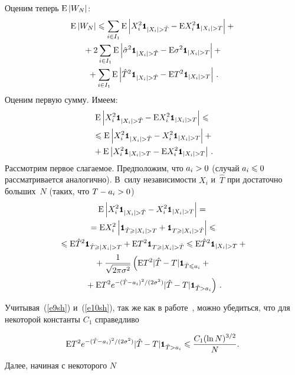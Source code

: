 \begin{multicols}{2}
Оценим теперь $\mbox{E}\left\vert W_N\right\vert$:
\begin{multline}
\mbox{E}\abs{W_N}\leqslant\sum\limits_{i\in I_1}\mbox{E}\abs{X_i^2\Ik_{|X_i|> 
\hat{T}}-\mbox{E}X_i^2\Ik_{|X_i|> T}}+{}\\
{}+2\sum\limits_{i\in I_1}\mbox{E}\abs{\hat{\sigma}^2\Ik_{|X_i|> \hat{T}}-
\mbox{E}\sigma^2\Ik_{|X_i|> T}}+{}\\
{}+
\sum\limits_{i\in I_1}\mbox{E}\abs{\hat{T}^2\Ik_{|X_i|> \hat{T}}-\mbox{E}T^2\Ik_{|X_i|> T}}\,.
\label{e11sh}
\end{multline}
Оценим первую сумму. Имеем:
\begin{multline}
\mbox{E}\abs{X_i^2\Ik_{|X_i|> \hat{T}}-\mbox{E}X_i^2\Ik_{|X_i|> T}}\leqslant{}\\
{}\leqslant
\mbox{E}\abs{X_i^2\Ik_{|X_i|> \hat{T}}-X_i^2\Ik_{|X_i|> T}}+{}\\
{}+
\mbox{E}\abs{X_i^2\Ik_{|X_i|> T}-\mbox{E}X_i^2\Ik_{|X_i|> T}}\,.\label{e12sh}
\end{multline}
Рассмотрим первое слагаемое. Предположим, что $a_i\hm>0$ (случай $a_i\hm\leqslant0$ 
рассматривается аналогично). В~силу независимости $X_i$ и~$\hat{T}$ при достаточно больших~$N$ 
(таких, что $T\hm-a_i\hm>0$)
\begin{multline*}
\mbox{E}\abs{X_i^2\Ik_{|X_i|> \hat{T}}-X_i^2\Ik_{|X_i|> T}}={}\\
{}=
\mbox{E}X_i^2\abs{\Ik_{\hat{T}\geqslant|X_i|> T}+\Ik_{T\geqslant|X_i|> 
\hat{T}}}\leqslant{}\\
{}\leqslant\mbox{E}\hat{T}^2\Ik_{\hat{T}\geqslant|X_i|> T}+\mbox{E}T^2\Ik_{T\geqslant|X_i|> \hat{T}}\leqslant
\mbox{E}\hat{T}^2\Ik_{|X_i|> T}+{}\\
{}+
\fr{1}{\sqrt{2\pi\sigma^2}}\left(\mbox{E}T^2|\hat{T}-T|\Ik_{\hat{T}\leqslant 
a_i}+{}\right.\\
\left.{}+\mbox{E}T^2e^{-{(\hat{T}-a_i)^2}/(2\sigma^2)}|\hat{T}-T|\Ik_{\hat{T}>a_i}\right)\,.
\end{multline*}

Учитывая~(\ref{e9sh}) и~(\ref{e10sh}), так же как в работе~\cite{8sh}, 
можно убедиться, что для некоторой константы $C_1$ справедливо

\noindent
\begin{equation}
\hspace*{-1mm}\mbox{E}T^2e^{-{(\hat{T}-a_i)^2}/(2\sigma^2)}|\hat{T}-T|\mbox{{\small \tt {1}}\hspace{-1.5mm}{\tt 1}}_{\hat{T}>a_i}\leqslant
\displaystyle\frac{\displaystyle C_1(\ln N)^{{3}/{2}}\mathstrut}{\displaystyle N\mathstrut}.\!\label{e13sh}
\end{equation}
Далее, начиная с некоторого $N$


\end{multicols}
